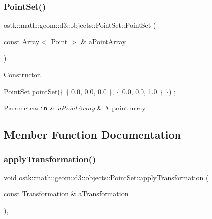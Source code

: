 \subsubsection{\texorpdfstring{Point\+Set()}{PointSet()}}
{\footnotesize\ttfamily ostk\+::math\+::geom\+::d3\+::objects\+::\+Point\+Set\+::\+Point\+Set (\begin{DoxyParamCaption}\item[{const Array$<$ \hyperlink{classostk_1_1math_1_1geom_1_1d3_1_1objects_1_1_point}{Point} $>$ \&}]{a\+Point\+Array }\end{DoxyParamCaption})}



Constructor. 


\begin{DoxyCode}
\hyperlink{classostk_1_1math_1_1geom_1_1d3_1_1objects_1_1_point_set_a285835d8348a60ceaf227bd76e3a5546}{PointSet} pointSet(\{ \{ 0.0, 0.0, 0.0 \}, \{ 0.0, 0.0, 1.0 \} \}) ;
\end{DoxyCode}



\begin{DoxyParams}[1]{Parameters}
\mbox{\tt in}  & {\em a\+Point\+Array} & A point array \\
\hline
\end{DoxyParams}


\subsection{Member Function Documentation}
\mbox{\label{classostk_1_1math_1_1geom_1_1d3_1_1objects_1_1_point_set_af03e071aa9d7a364a0c76f563b65a57e}} 
\subsubsection{\texorpdfstring{apply\+Transformation()}{applyTransformation()}}
{\footnotesize\ttfamily void ostk\+::math\+::geom\+::d3\+::objects\+::\+Point\+Set\+::apply\+Transformation (\begin{DoxyParamCaption}\item[{const \hyperlink{classostk_1_1math_1_1geom_1_1d3_1_1_transformation}{Transformation} \&}]{a\+Transformation }\end{DoxyParamCaption})\hspace{0.3cm}{\ttfamily [override]}, {\ttfamily [virtual]}}



